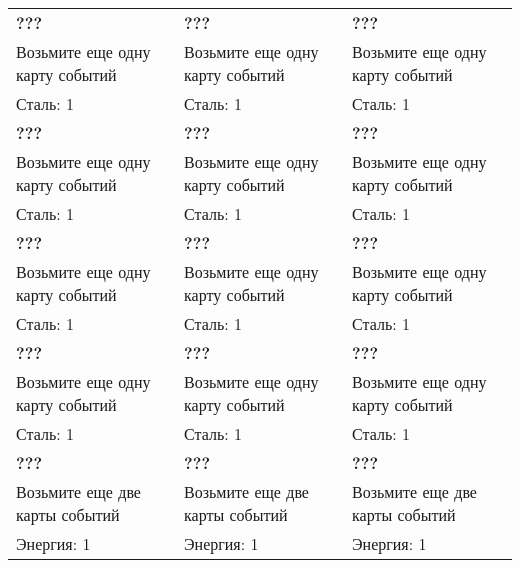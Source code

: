 \documentclass[a4paper,12pt]{article}
\begin{document}
  \begin{tabular}{|p{5cm}|p{5cm}|p{5cm}|}
    \hline
      \textbf{???} & \textbf{???} & \textbf{???} \\
      Возьмите еще одну карту событий & Возьмите еще одну карту событий & Возьмите еще одну карту событий \\
      Сталь: 1 & Сталь: 1 & Сталь: 1 \\
    \hline
      \textbf{???} & \textbf{???} & \textbf{???} \\
      Возьмите еще одну карту событий & Возьмите еще одну карту событий & Возьмите еще одну карту событий \\
      Сталь: 1 & Сталь: 1 & Сталь: 1 \\
    \hline
      \textbf{???} & \textbf{???} & \textbf{???} \\
      Возьмите еще одну карту событий & Возьмите еще одну карту событий & Возьмите еще одну карту событий \\
      Сталь: 1 & Сталь: 1 & Сталь: 1 \\
    \hline
      \textbf{???} & \textbf{???} & \textbf{???} \\
      Возьмите еще одну карту событий & Возьмите еще одну карту событий & Возьмите еще одну карту событий \\
      Сталь: 1 & Сталь: 1 & Сталь: 1 \\

    \hline
      \textbf{???} & \textbf{???} & \textbf{???} \\
      Возьмите еще две карты событий & Возьмите еще две карты событий & Возьмите еще две карты событий \\
      Энергия: 1 & Энергия: 1 & Энергия: 1 \\
    \hline
  \end{tabular}
  \newpage
\end{document}
